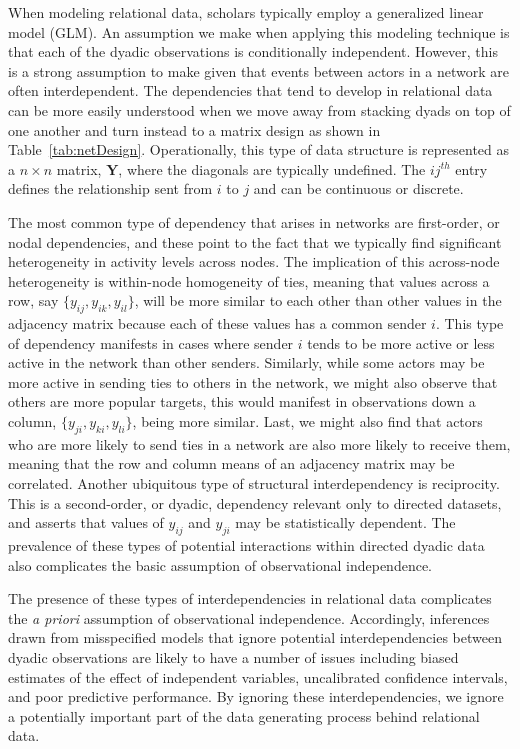 \documentclass[9pt,twocolumn,twoside,lineno]{pnas-new}
\begin{document}
When modeling relational data, scholars typically employ a generalized linear model (GLM). An assumption we make when applying this modeling technique is that each of the dyadic observations is conditionally independent. However, this is a strong assumption to make given that events between actors in a network are often interdependent. The dependencies that tend to develop in relational data can be more easily understood when we move away from stacking dyads on top of one another and turn instead to a matrix design as shown in Table~\ref{tab:netDesign}. Operationally, this type of data structure is represented as a $n \times n$ matrix, $\mathbf{Y}$, where the diagonals are typically undefined. The $ij^{th}$ entry defines the relationship sent from $i$ to $j$ and can be continuous or discrete.%

The most common type of dependency that arises in networks are first-order, or nodal dependencies, and these point to the fact that we typically find significant heterogeneity in activity levels across nodes. The implication of this across-node heterogeneity is within-node homogeneity of ties, meaning that values across a row, say $\{y_{ij},y_{ik},y_{il}\}$, will be more similar to each other than other values in the adjacency matrix because each of these values has a common sender $i$. This type of dependency manifests in cases where sender $i$ tends to be more active or less active in the network than other senders. Similarly, while some actors may be more active in sending ties to others in the network, we might also observe that others are more popular targets, this would manifest in observations down a column, $\{y_{ji},y_{ki},y_{li}\}$, being more similar. Last, we might also find that actors who are more likely to send ties in a network are also more likely to receive them, meaning that the row and column means of an adjacency matrix may be correlated. Another ubiquitous type of structural interdependency is reciprocity. This is a second-order, or dyadic, dependency relevant only to directed datasets, and asserts that values of $y_{ij}$ and $y_{ji}$ may be statistically dependent. The prevalence of these types of potential interactions within directed dyadic data also complicates the basic assumption of observational independence.

The presence of these types of interdependencies in relational data complicates the \textit{a priori} assumption of observational independence.  Accordingly, inferences drawn from misspecified models that ignore potential interdependencies between dyadic observations are likely to have a number of issues including biased estimates of the effect of independent variables, uncalibrated confidence intervals, and poor predictive performance. By ignoring these interdependencies, we ignore a potentially important part of the data generating process behind relational data.
\end{document}
